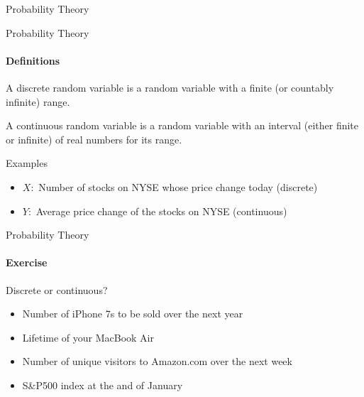 \documentclass{beamer}\usepackage[]{graphicx}\usepackage[]{color}
\begin{document}
\begin{darkframes}
\begin{frame}[label=lists]{Probability Theory}
				
    \end{frame}
    
       
    

    \begin{frame}[label=lists]{Probability Theory}
		\framesubtitle{Definitions}    
      	
      	\begin{definition}
       		A \alert{discrete random variable} is a random variable with a finite (or countably infinite) range. 
       		
       		A \alert{continuous random variable} is a random variable with an interval (either finite or infinite) of real numbers for its range.
      	\end{definition}
    
    
    	\begin{exampleblock}{Examples}
      		\begin{itemize}

				\item $X:$ Number of stocks on NYSE whose price change today (discrete)
				\item $Y:$ Average price change of the stocks on NYSE (continuous)

			\end{itemize}
        \end{exampleblock}
  
	\end{frame}  
	
	
	
   \begin{frame}[label=lists]{Probability Theory}
		\framesubtitle{Exercise}    
      	Discrete or continuous?
      		\begin{itemize}
				
				\item Number of iPhone 7s to be sold over the next year
				\item Lifetime of your MacBook Air
				\item Number of unique visitors to Amazon.com over the next week
      			\item S\&P500 index at the and of January %
    
			\end{itemize}
	\end{frame} 
	

\end{darkframes}
\end{document}
